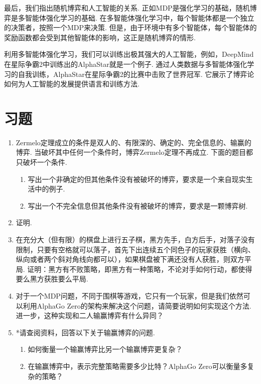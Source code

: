 最后，我们指出随机博弈和人工智能的关系. 正如MDP是强化学习的基础，随机博弈是多智能体强化学习的基础. 在多智能体强化学习中，每个智能体都是一个独立的决策者，按照一个MDP来决策. 但是，由于环境中有多个智能体，每个智能体的奖励函数都会受到其他智能体的影响，这正是随机博弈的情形. 

利用多智能体强化学习，我们可以训练出极其强大的人工智能，例如，DeepMind在星际争霸2中训练出的AlphaStar就是一个例子. 通过人类数据与多智能体强化学习的自我训练，AlphaStar在星际争霸2的比赛中击败了世界冠军. 它展示了博弈论如何为人工智能的发展提供语言和训练方法. 

\section{习题}
\begin{enumerate}[wide, labelindent=0pt]
    \item \label{exercise:zermelo-fail} Zermelo定理成立的条件是双人的、有限深的、确定的、完全信息的、输赢的博弈. 当破坏其中任何一个条件时，博弈Zermelo定理不再成立. 下面的题目都只破坏一个条件.
    \begin{enumerate}
        \item 写出一个非确定的但其他条件没有被破坏的博弈，要求是一个来自现实生活中的例子.
        \item 写出一个不完全信息但其他条件没有被破坏的博弈，要求是一颗博弈树.
    \end{enumerate}

    \item \label{exercise:zermelo-draw} 证明.

    \item \label{exercise:gomoku} 在充分大（但有限）的棋盘上进行五子棋，黑方先手，白方后手，对落子没有限制，只要有空格就可以落子，首先下出连续五个同色子的玩家获胜（横向、纵向或者两个斜对角线向都可以），如果棋盘被下满还没有人获胜，则双方平局. 证明：黑方有不败策略，即黑方有一种策略，不论对手如何行动，都使得要么黑方获胜要么平局.
    
    \item 对于一个MDP问题，不同于围棋等游戏，它只有一个玩家，但是我们依然可以利用AlphaGo Zero的架构来解决这个问题，请简要说明如何实现这个方法. 进一步，这种实现和二人输赢博弈有什么异同？
    
    \item *请查阅资料，回答以下关于输赢博弈的问题. 
    \begin{enumerate}
        \item 如何衡量一个输赢博弈比另一个输赢博弈更复杂？
        \item 在输赢博弈中，表示完整策略需要多少比特？AlphaGo Zero可以衡量多复杂的策略？
    \end{enumerate}
    

\end{enumerate}

